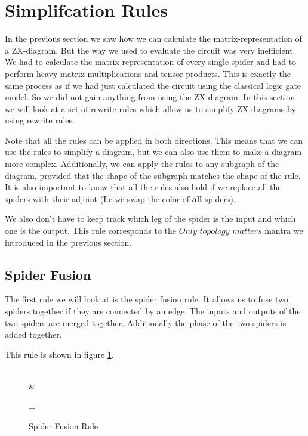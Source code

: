 \section{Simplifcation Rules}

In the previous section we saw how we can calculate the matrix-representation of a ZX-diagram. But the way we used to evaluate the circuit was very inefficient. We had to calculate the matrix-representation of every single spider and had to perform heavy matrix multiplications and tensor products. This is exactly the same process as if we had just calculated the circuit using the classical logic gate model. So we did not gain anything from using the ZX-diagram. In this section we will look at a set of rewrite rules which allow us to simplify ZX-diagrams by using rewrite rules.

Note that all the rules can be applied in both directions. This means that we can use the rules to simplify a diagram, but we can also use them to make a diagram more complex. Additionally, we can apply the rules to any subgraph of the diagram, provided that the shape of the subgraph matches the shape of the rule. It is also important to know that all the rules also hold if we replace all the spiders with their adjoint (I.e.we swap the color of $\mathbf{all}$ spiders).

We also don't have to keep track which leg of the spider is the input and which one is the output. This rule corresponds to the $\textit{Only topology matters}$ mantra we introduced in the previous section.

\subsection{Spider Fusion}

The first rule we will look at is the spider fusion rule. It allows us to fuse two spiders together if they are connected by an edge. The inputs and outputs of the two spiders are merged together. Additionally the phase of the two spiders is added together.

This rule is shown in figure \ref{fig:spider_fusion_rule}.

\begin{figure}[h]
    \centering
    \begin{ZX}
          \zxZ{\alpha} \ar[rd,o.]  \\
        \zxNone{} &   \zxZ{\beta}  
    \end{ZX} =
    \begin{ZX}
          \zxZ{\alpha+\beta} 
    \end{ZX}
    \caption{Spider Fusion Rule}
    \label{fig:spider_fusion_rule}
\end{figure}



